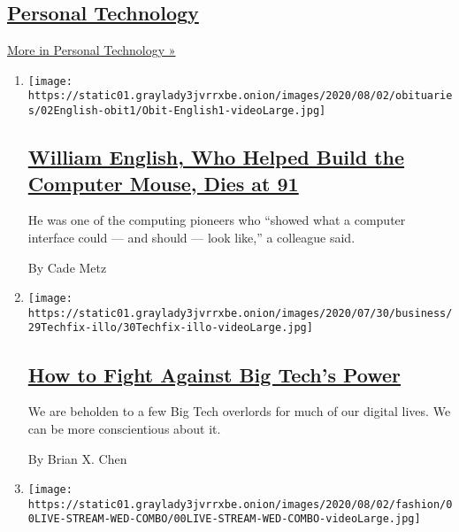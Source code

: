 \hypertarget{personal-technology}{%
\subsection{\texorpdfstring{\href{/section/technology/personaltech}{Personal
Technology}}{Personal Technology}}\label{personal-technology}}

\href{/section/technology/personaltech}{More in Personal Technology »}

\begin{enumerate}
\def\labelenumi{\arabic{enumi}.}
\item
  \texttt{[image: https://static01.graylady3jvrrxbe.onion/images/2020/08/02/obituaries/02English-obit1/Obit-English1-videoLarge.jpg]}

  \hypertarget{william-english-who-helped-build-the-computer-mouse-dies-at-91}{%
  \subsection{\texorpdfstring{\href{/2020/07/31/technology/william-english-who-helped-build-the-computer-mouse-dies-at-91.html}{William
  English, Who Helped Build the Computer Mouse, Dies at
  91}}{William English, Who Helped Build the Computer Mouse, Dies at 91}}\label{william-english-who-helped-build-the-computer-mouse-dies-at-91}}

  He was one of the computing pioneers who ``showed what a computer
  interface could --- and should --- look like,'' a colleague said.

  By Cade Metz
\item
  \texttt{[image: https://static01.graylady3jvrrxbe.onion/images/2020/07/30/business/29Techfix-illo/30Techfix-illo-videoLarge.jpg]}

  \hypertarget{how-to-fight-against-big-techs-power}{%
  \subsection{\texorpdfstring{\href{/2020/07/29/technology/personaltech/big-tech-power-how-to-fight.html}{How
  to Fight Against Big Tech's
  Power}}{How to Fight Against Big Tech's Power}}\label{how-to-fight-against-big-techs-power}}

  We are beholden to a few Big Tech overlords for much of our digital
  lives. We can be more conscientious about it.

  By Brian X. Chen
\item
  \texttt{[image: https://static01.graylady3jvrrxbe.onion/images/2020/08/02/fashion/00LIVE-STREAM-WED-COMBO/00LIVE-STREAM-WED-COMBO-videoLarge.jpg]}


\end{enumerate}
